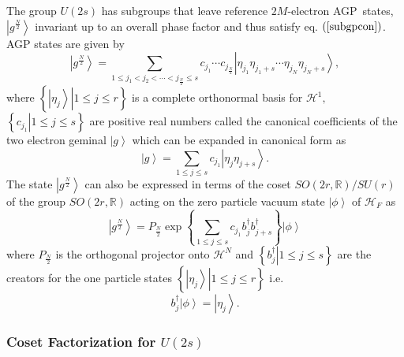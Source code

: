 \documentclass[aps,preprint]{revtex4}%
\begin{document}
The group $U\left(  2s\right)  $ has subgroups that leave reference
$2M$-electron AGP\ states,$\left\vert g^{\frac{N}{2}}\right\rangle $ invariant
up to an overall phase factor and thus satisfy eq. $\left(  \ref{subgpcon}%
\right)  $. AGP states are given \cite{weiner2003} by%
\begin{equation}
\left\vert g^{\frac{N}{2}}\right\rangle =\sum_{1\leq j_{1}<j_{2}%
<\cdots<j_{\frac{N}{2}}\leq s}c_{j_{1}}\cdots c_{j_{\frac{N}{2}}}\left\vert
\eta_{j_{1}}\eta_{j_{1}+s}\cdots\eta_{j_{N}}\eta_{j_{N}+s}\right\rangle ,
\label{canexp}%
\end{equation}
where $\left\{  \left.  \left\vert \eta_{j}\right\rangle \right\vert 1\leq
j\leq r\right\}  $ is a complete orthonormal basis for $\mathcal{H}^{1},$
$\left\{  \left.  c_{j_{1}}\right\vert 1\leq j\leq s\right\}  $ are positive
real numbers called the canonical coefficients of the two electron geminal
$\left\vert g\right\rangle $ which can be expanded in canonical form as%
\begin{equation}
\left\vert g\right\rangle =\sum_{1\leq j\leq s}c_{j_{1}}\left\vert \eta
_{j}\eta_{j+s}\right\rangle . \label{gemcan}%
\end{equation}
The state $\left\vert g^{\frac{N}{2}}\right\rangle $ can also be expressed in
terms of the coset $SO\left(  2r,\mathbb{R}\right)  /SU\left(  r\right)  $ of
the group $SO\left(  2r,\mathbb{R}\right)  $ acting on the zero particle
vacuum state $\left\vert \phi\right\rangle $ of $\mathcal{H}_{F}$
\cite{WeinerOhrnDeumens1}\cite{weinerOhrnDeumens2}\cite{Rowe} as
\begin{equation}
\left\vert g^{\frac{N}{2}}\right\rangle =P_{\frac{N}{2}}\exp\left\{
\sum_{1\leq j\leq s}c_{j_{1}}b_{j}^{\dagger}b_{j+s}^{\dagger}\right\}
\left\vert \phi\right\rangle
\end{equation}
where $P_{\frac{N}{2}}$ is the orthogonal projector onto $\mathcal{H}^{N}$ and
$\left\{  \left.  b_{j}^{\dagger}\right\vert 1\leq j\leq s\right\}  $ are the
creators for the one particle states $\left\{  \left.  \left\vert \eta
_{j}\right\rangle \right\vert 1\leq j\leq r\right\}  $ i.e.
\begin{equation}
b_{j}^{\dagger}\left\vert \phi\right\rangle =\left\vert \eta_{j}\right\rangle
.
\end{equation}


\subsubsection{Coset Factorization for $U\left(  2s\right)  $\label{factor}}
\end{document}
